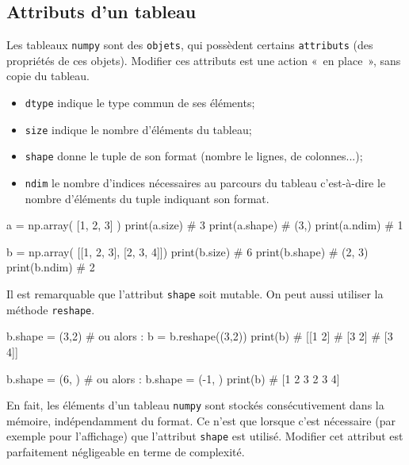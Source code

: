 \documentclass[10pt,fleqn]{article} %
\begin{document}
\subsection{Attributs d'un tableau}
Les tableaux \texttt{numpy} sont des \texttt{objets}, qui possèdent
certains \texttt{attributs} (des propriétés de ces objets).
Modifier ces attributs est une action «~en place~», sans copie du tableau.
\begin{itemize}
\item 
  \texttt{dtype} indique le type commun de ses éléments;
\item 
  \texttt{size} indique le nombre d'éléments du tableau;
\item 
  \texttt{shape} donne le tuple de son format (nombre le lignes, de colonnes...);
\item 
  \texttt{ndim} le nombre d'indices nécessaires au parcours du tableau
  c'est-à-dire le nombre d'éléments du tuple indiquant son format.
\end{itemize}

\begin{py}
\begin{multicols}{2}
\begin{python}
a = np.array( [1, 2, 3] )
print(a.size)
# 3
print(a.shape)
# (3,)
print(a.ndim)
# 1

b = np.array( [[1, 2, 3],
               [2, 3, 4]])
print(b.size)
# 6
print(b.shape)
# (2, 3)
print(b.ndim)
# 2  
\end{python}
\end{multicols}
\end{py}

Il est remarquable que l'attribut \texttt{shape} soit mutable. On peut
aussi utiliser la méthode \texttt{reshape}.

\begin{py}
\begin{multicols}{2}
\begin{python}
b.shape = (3,2) # ou alors : b = b.reshape((3,2))
print(b)
# [[1 2]
#  [3 2]
#  [3 4]]

b.shape = (6, ) # ou alors : b.shape = (-1, )
print(b)
# [1 2 3 2 3 4]  
\end{python}
\end{multicols}
\end{py}

En fait, les éléments d'un tableau \texttt{numpy} sont stockés
consécutivement dans la mémoire, indépendamment du format. Ce n'est
que lorsque c'est nécessaire (par exemple pour l'affichage) que
l'attribut \texttt{shape} est utilisé. Modifier cet attribut est
parfaitement négligeable en terme de complexité.
\end{document}

